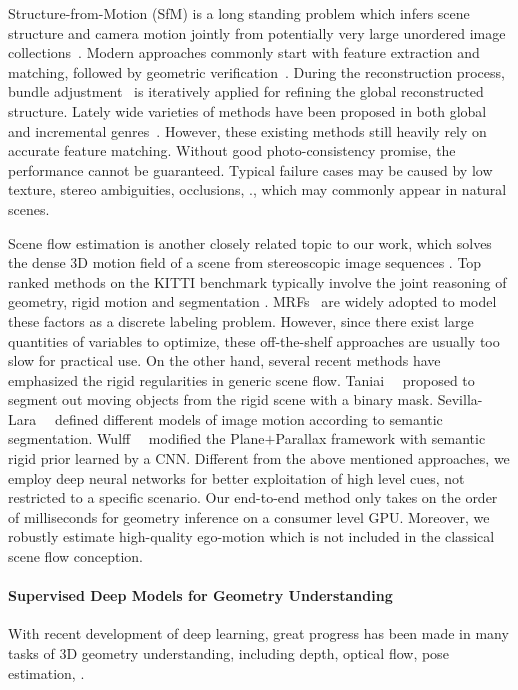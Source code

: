 \documentclass[10pt,twocolumn,letterpaper]{article}
\newcommand{\jpshi}[1]{{{\color{blue} Jianping: #1}}}
\begin{document}
Structure-from-Motion (SfM) is a long standing problem which infers scene structure and camera motion jointly from potentially very large unordered image collections~\cite{CGV-052, Hartley2004}. 
Modern approaches commonly start with feature extraction and matching, followed by geometric verification~\cite{schoenberger2016sfm}. During the reconstruction process, bundle adjustment~\cite{triggs1999bundle} is iteratively applied for refining the global reconstructed structure. Lately wide varieties of methods have been proposed in both global and incremental genres~\cite{sweeney2015optimizing, wu2013towards}. 
However, these existing methods still heavily rely on accurate feature matching. Without good photo-consistency promise, the performance cannot be guaranteed. Typical failure cases may be caused by low texture, stereo ambiguities, occlusions, \etc., which may commonly appear in natural scenes.


Scene flow estimation is another closely related topic to our work, which solves the dense 3D motion field of a scene from stereoscopic image sequences \cite{vedula1999three}. Top ranked methods on the KITTI benchmark typically involve the joint reasoning of geometry, rigid motion and segmentation \cite{Behl2017ICCV, vogel20153d}. %
MRFs~\cite{li1994markov} are widely adopted to model these factors as a discrete labeling problem. However, since there exist large quantities of variables to optimize, these off-the-shelf approaches are usually too slow for practical use. On the other hand, several recent methods have emphasized the rigid regularities in generic scene flow. Taniai~\etal~\cite{Taniai2017} proposed to segment out moving objects from the rigid scene with a binary mask. 
Sevilla-Lara~\etal~\cite{sevilla2016optical} defined different models of image motion according to semantic segmentation.
Wulff~\etal~\cite{wulff2017optical} modified the Plane$+$Parallax framework with semantic rigid prior learned by a CNN. 
Different from the above mentioned approaches, we employ deep neural networks for better exploitation of high level cues, not restricted to a specific scenario. Our end-to-end method only takes on the order of milliseconds for geometry inference on a consumer level GPU. %
Moreover, we robustly estimate high-quality ego-motion %
which is not included in the classical scene flow conception.

\paragraph{Supervised Deep Models for Geometry Understanding}
With recent development of deep learning, great progress has been made in many tasks of 3D geometry understanding, including depth, optical flow, pose estimation, \etc. 
\end{document}
